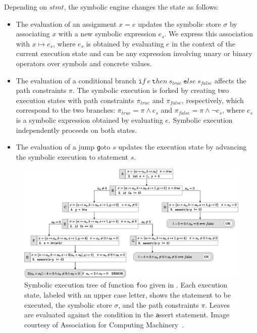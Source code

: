 \noindent Depending on $stmt$, the symbolic engine changes the state as follows:

\begin{itemize}
	\item The evaluation of an assignment $x=e$ updates the symbolic store $\sigma$ by associating $x$ with a new symbolic expression $e_s$. We express this association with $x\mapsto e_s$, where $e_s$ is obtained by evaluating $e$ in the context of the current execution state and  can be any expression involving unary or binary operators over symbols and concrete values.
	\item The evaluation of a conditional branch ${\texttt if}~e~{\texttt then}~s_{true}~{\texttt else}~s_{false}$ affects the path constraints $\pi$. The symbolic execution is forked by creating two execution states with path constraints $\pi_{true}$ and $\pi_{false}$, respectively, which correspond to the two branches: $\pi_{true}=\pi \wedge e_s$ and $\pi_{false}=\pi \wedge \neg e_s$, where $e_s$ is a symbolic expression obtained by evaluating $e$. 
	Symbolic execution independently proceeds on both states.
	\item The evaluation of a jump {\texttt goto} $s$ updates the execution state by advancing the symbolic execution to statement $s$. 
\end{itemize}

\begin{figure}[t]
	\hspace{-3cm}
	\includegraphics[width=1.5\columnwidth]{images/execution-tree.eps} 
	\caption{Symbolic execution tree of function {\texttt foo} given in . Each execution state, labeled with an upper case letter, shows the statement to be executed, the symbolic store $\sigma$, and the path constraints $\pi$. Leaves are evaluated against the condition in the {\texttt assert} statement. Image courtesy of Association for Computing Machinery~\cite{Baldoni:2018:SSE:3212709.3182657}.}
	\label{fig:example-symbolic-execution}
	\vspace{-1mm}
\end{figure}

